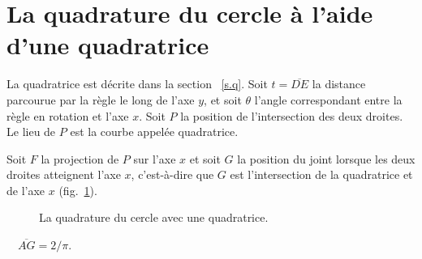 


\section{La quadrature du cercle à l'aide d'une  quadratrice}\label{s.square-quad}


La quadratrice est décrite dans la section ~\ref{s.q}. Soit $t=\overline{DE}$ la distance parcourue par la règle  le long de l'axe $y$, et soit $\theta$ l'angle correspondant entre la règle en rotation et l'axe $x$. Soit $P$ la position de l'intersection des deux droites. Le lieu de $P$ est la courbe appelée quadratrice.

Soit $F$ la projection de $P$ sur l'axe $x$ et soit $G$ la position du joint lorsque les deux droites atteignent l'axe $x$, c'est-à-dire que $G$ est l'intersection de  la quadratrice et de l'axe $x$ (fig.~\ref{f.square-quad}).

\begin{figure}[ht]
\centering
{}
\caption{La quadrature du cercle avec une quadratrice.}
\label{f.square-quad}
\end{figure}

\begin{theorem}
$\quad\overline{AG}=2/\pi$.
\end{theorem}

